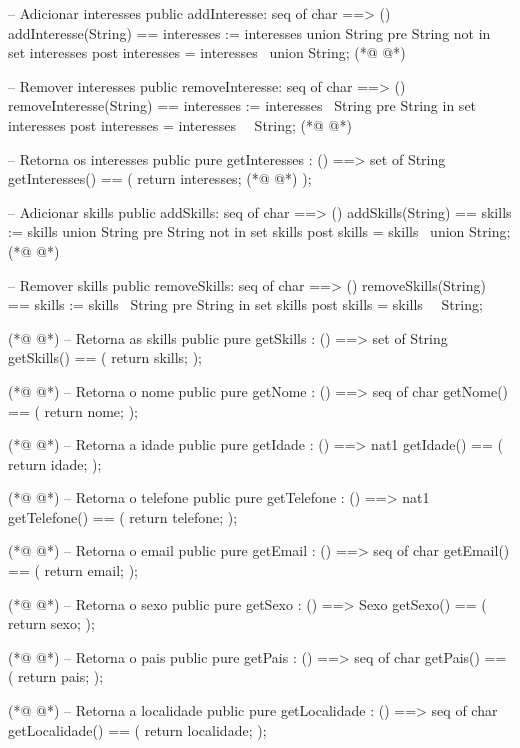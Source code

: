 \begin{vdmpp}[breaklines=true]
 -- Adicionar interesses
 public addInteresse: seq of char ==> ()
 addInteresse(String) == interesses := interesses union {String}
 pre String not in set interesses
 post interesses = interesses~ union {String};
(*@
\label{addSkills:94}
@*)
 
 -- Remover interesses
 public removeInteresse: seq of char ==> ()
 removeInteresse(String) == interesses := interesses \ {String}
 pre String in set interesses
 post interesses = interesses~ \ {String};
(*@
\label{removeSkills:100}
@*)
 
 -- Retorna os interesses
 public pure getInteresses : () ==> set of String
 getInteresses() ==
 (
  return interesses;
(*@
\label{getSkills:106}
@*)
 );
 
 -- Adicionar skills
 public addSkills: seq of char ==> ()
 addSkills(String) == skills := skills union {String}
 pre String not in set skills
 post skills = skills~ union {String};
(*@
\label{getNome:113}
@*)
 
 -- Remover skills
 public removeSkills: seq of char ==> ()
 removeSkills(String) == skills := skills \ {String}
 pre String in set skills
 post skills = skills~ \ {String};
 
(*@
\label{getIdade:120}
@*)
 -- Retorna as skills
 public pure getSkills : () ==> set of String
 getSkills() ==
 (
  return skills;
 );
 
(*@
\label{getTelefone:127}
@*)
 -- Retorna o nome
 public pure getNome : () ==> seq of char
 getNome() ==
 (
  return nome;
 );
 
(*@
\label{getEmail:134}
@*)
 -- Retorna a idade
 public pure getIdade : () ==> nat1
 getIdade() ==
 (
  return idade;
 );
 
(*@
\label{getSexo:141}
@*)
 -- Retorna o telefone
 public pure getTelefone : () ==> nat1
 getTelefone() ==
 (
  return telefone;
 );
 
(*@
\label{getPais:148}
@*)
 -- Retorna o email
 public pure getEmail : () ==> seq of char
 getEmail() ==
 (
  return email;
 );
 
(*@
\label{getLocalidade:155}
@*)
 -- Retorna o sexo
 public pure getSexo : () ==> Sexo
 getSexo() ==
 (
  return sexo;
 );
 
(*@
\label{getEscolaridade:162}
@*)
 -- Retorna o pais
 public pure getPais : () ==> seq of char
 getPais() ==
 (
  return pais;
 );
 
(*@
\label{getlistaEscolaridades:169}
@*)
 -- Retorna a localidade
 public pure getLocalidade : () ==> seq of char
 getLocalidade() ==
 (
  return localidade;
 );
 

\end{vdmpp}
